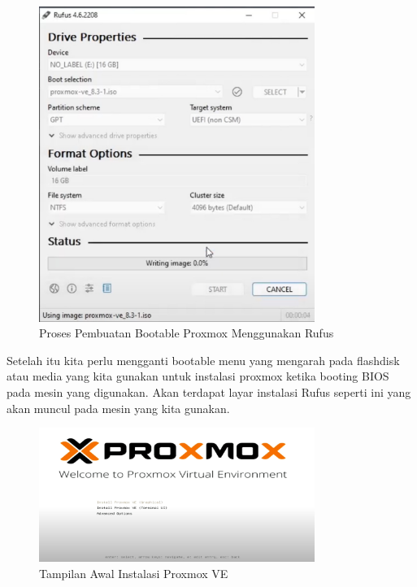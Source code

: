 \begin{figure}[H]
    \centering
    \includegraphics[width=0.8\textwidth]{figures/proxmox-install-rufus-1.jpg}
    \caption{Proses Pembuatan Bootable Proxmox Menggunakan Rufus}
    \label{fig:proxmox_rufus}
\end{figure}

Setelah itu kita perlu mengganti bootable menu yang mengarah pada flashdisk atau media yang kita gunakan untuk instalasi proxmox ketika booting BIOS pada mesin yang digunakan.
Akan terdapat layar instalasi Rufus seperti ini yang akan muncul pada mesin yang kita gunakan.

\begin{figure}[H]
    \centering
    \includegraphics[width=0.8\textwidth]{figures/proxmox-install-ui-2.jpg}
    \caption{Tampilan Awal Instalasi Proxmox VE}
    \label{fig:proxmox_install_ui}
\end{figure}


